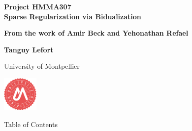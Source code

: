 \documentclass[unknownkeysallowed]{beamer}
\begin{document}



\begin{frame}
\bigskip
\bigskip
\begin{center}{
\LARGE\color{marron}
\textbf{Project HMMA307 \\ Sparse Regularization via Bidualization}
\textbf{ }\\
\vspace{0.5cm}
}

\color{marron}
\textbf{From the work of Amir Beck and Yehonathan Refael}
\end{center}

\vspace{0.5cm}

\begin{center}
\textbf{Tanguy Lefort} \\
\vspace{0.1cm}

University of Montpellier \\
\end{center}

\centering
\includegraphics[width=0.13\textwidth]{Logo}

\end{frame}






\begin{frame}{Table of Contents}
\tableofcontents[hideallsubsections]
\end{frame}
\end{document}
